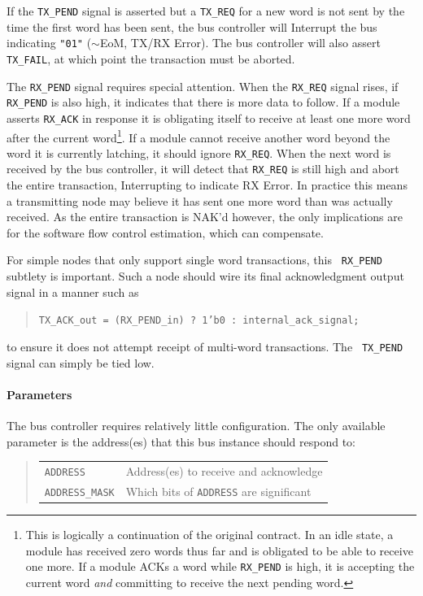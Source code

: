 If the {\tt TX\_PEND} signal is asserted but a {\tt TX\_REQ} for a new word is
not sent by the time the first word has been sent, the bus controller will
Interrupt the bus indicating {\tt "01"} ($\sim$EoM, TX/RX Error). The bus
controller will also assert {\tt TX\_FAIL}, at which point the transaction
must be aborted.

The {\tt RX\_PEND} signal requires special attention. When the {\tt RX\_REQ}
signal rises, if {\tt RX\_PEND} is also high, it indicates that there is more
data to follow. If a module asserts {\tt RX\_ACK} in response it is obligating
itself to receive at least one more word after the current word\footnote{
  This is logically a continuation of the original contract. In an idle state, a
  module has received zero words thus far and is obligated to be able to receive
  one more. If a module ACKs a word while {\tt RX\_PEND} is high, it is
  accepting the current word {\em and} committing to receive the next pending
  word.}.
If a module cannot receive another word beyond the word it is currently
latching, it should ignore {\tt RX\_REQ}.  When the next word is received by
the bus controller, it will detect that {\tt RX\_REQ} is still high and abort
the entire transaction, Interrupting to indicate RX Error. In practice this
means a transmitting node may believe it has sent one more word than was
actually received. As the entire transaction is NAK'd however, the only
implications are for the software flow control estimation, which can
compensate.

For simple nodes that only support single word transactions, this {\tt
RX\_PEND} subtlety is important. Such a node should wire its final
acknowledgment output signal in a manner such as
\begin{quote}
  {\tt TX\_ACK\_out = (RX\_PEND\_in) ? 1'b0 : internal\_ack\_signal;}
\end{quote}
to ensure it does not attempt receipt of multi-word transactions. The {\tt
TX\_PEND} signal can simply be tied low.

\newpage
\paragraph{Parameters}
The bus controller requires relatively little configuration. The only
available parameter is the address(es) that this bus instance should respond
to:

\begin{quote}
\begin{tabular}{l l}
  {\tt ADDRESS}       & Address(es) to receive and acknowledge \\
  {\tt ADDRESS\_MASK} & Which bits of {\tt ADDRESS} are significant \\
\end{tabular}
\end{quote}

